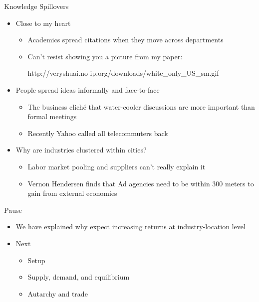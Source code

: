 \documentclass[ignorenonframetext,]{beamer}
\begin{document}
\begin{frame}{Knowledge Spillovers}

    \begin{itemize}
        \item Close to my heart
        \begin{itemize}
            \item Academics spread citations when they move across departments
            \item Can't resist showing you a picture from my paper: 

            http://veryshuai.no-ip.org/downloads/white\_only\_US\_sm.gif
        \end{itemize}
        \item People spread ideas informally and face-to-face
        \begin{itemize}
            \item The business cliché that water-cooler discussions are more important than formal meetings
            \item Recently Yahoo called all telecommuters back
        \end{itemize}
        \item Why are industries clustered within cities?
        \begin{itemize}
            \item Labor market pooling and suppliers can't really explain it
            \item Vernon Hendersen finds that Ad agencies need to be within 300 meters to gain from external economies
        \end{itemize}
    \end{itemize}

\end{frame}

\begin{frame}{Pause}

    \begin{itemize}
        \item We have explained why expect increasing returns at industry-location level
        \item Next
        \begin{itemize}
            \item Setup
            \item Supply, demand, and equilibrium 
            \item Autarchy and trade  
        \end{itemize}
    \end{itemize}

\end{frame}
\end{document}
